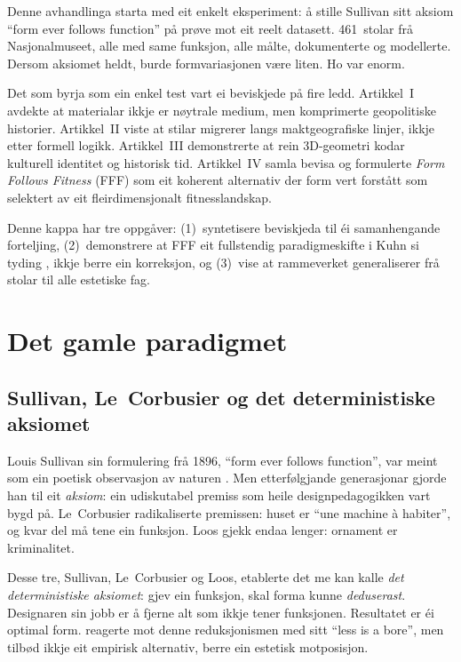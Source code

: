 \documentclass[12pt,a4paper]{article}
\begin{document}
Denne avhandlinga starta med eit enkelt eksperiment: \aa{} stille Sullivan sitt aksiom \enquote{form ever follows function} \citep{sullivan1896} p\aa{} pr\o{}ve mot eit reelt datasett. 461~stolar fr\aa{} Nasjonalmuseet, alle med same funksjon, alle m\aa{}lte, dokumenterte og modellerte. Dersom aksiomet heldt, burde formvariasjonen v\ae{}re liten. Ho var enorm.

Det som byrja som ein enkel test vart ei beviskjede p\aa{} fire ledd. Artikkel~I \citep{finne2026a} avdekte at materialar ikkje er n\o{}ytrale medium, men komprimerte geopolitiske historier. Artikkel~II \citep{finne2026b} viste at stilar migrerer langs maktgeografiske linjer, ikkje etter formell logikk. Artikkel~III \citep{finne2026c} demonstrerte at rein 3D-geometri kodar kulturell identitet og historisk tid. Artikkel~IV \citep{finne2026d} samla bevisa og formulerte \emph{Form Follows Fitness} (FFF) som eit koherent alternativ der form vert forst\aa{}tt som selektert av eit fleirdimensjonalt fitnesslandskap.

Denne kappa har tre oppg\aa{}ver: (1)~syntetisere beviskjeda til \'{e}i samanhengande forteljing, (2)~demonstrere at FFF eit fullstendig paradigmeskifte i Kuhn si tyding \citep{kuhn1962}, ikkje berre ein korreksjon, og (3)~vise at rammeverket generaliserer fr\aa{} stolar til alle estetiske fag.

\section{Det gamle paradigmet}
\label{sec:gammalt}

\subsection{Sullivan, Le~Corbusier og det deterministiske aksiomet}

Louis Sullivan sin formulering fr\aa{} 1896, \enquote{form ever follows function}, var meint som ein poetisk observasjon av naturen \citep{sullivan1896}. Men etterf\o{}lgjande generasjonar gjorde han til eit \emph{aksiom}: ein udiskutabel premiss som heile designpedagogikken vart bygd p\aa{}. Le~Corbusier \citep{corbusier1923} radikaliserte premissen: huset er \enquote{une machine \`{a} habiter}, og kvar del m\aa{} tene ein funksjon. Loos \citep{loos1908} gjekk endaa lenger: ornament er kriminalitet.

Desse tre, Sullivan, Le~Corbusier og Loos, etablerte det me kan kalle \emph{det deterministiske aksiomet}: gjev ein funksjon, skal forma kunne \emph{deduserast}. Designaren sin jobb er \aa{} fjerne alt som ikkje tener funksjonen. Resultatet er \'{e}i optimal form. \citet{venturi1966} reagerte mot denne reduksjonismen med sitt \enquote{less is a bore}, men tilb\o{}d ikkje eit empirisk alternativ, berre ein estetisk motposisjon.
\end{document}
